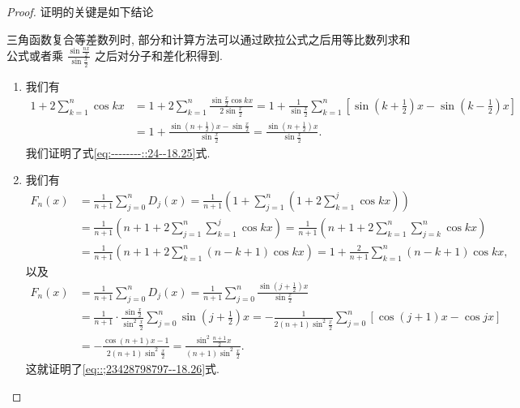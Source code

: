 \documentclass[../../main.tex]{subfiles}
\begin{document}
\begin{proof}
证明的关键是如下结论
\begin{conclusion}
三角函数复合等差数列时, 部分和计算方法可以通过欧拉公式之后用等比数列求和公式或者乘 $\frac{\sin \frac{nx}{2}}{\sin \frac{x}{2}}$ 之后对分子和差化积得到.
\end{conclusion}
\begin{enumerate}
\item 我们有
\begin{align*}
1 + 2\sum_{k = 1}^{n} \cos kx &= 1 + 2\sum_{k = 1}^{n} \frac{\sin \frac{x}{2} \cos kx}{2\sin \frac{x}{2}} = 1 + \frac{1}{\sin \frac{x}{2}} \sum_{k = 1}^{n} [\sin\left(k + \frac{1}{2}\right)x - \sin\left(k - \frac{1}{2}\right)x] \\
&= 1 + \frac{\sin\left(n + \frac{1}{2}\right)x - \sin \frac{x}{2}}{\sin \frac{x}{2}} = \frac{\sin\left(n + \frac{1}{2}\right)x}{\sin \frac{x}{2}}.
\end{align*}
我们证明了式\eqref{eq:--------::24--18.25}式.

\item 我们有
\begin{align*}
F_n(x) &= \frac{1}{n + 1}\sum_{j = 0}^{n} D_j(x) = \frac{1}{n + 1} \left( 1 + \sum_{j = 1}^{n} \left(1 + 2\sum_{k = 1}^{j} \cos kx \right) \right) \\
&= \frac{1}{n + 1} \left( n + 1 + 2\sum_{j = 1}^{n} \sum_{k = 1}^{j} \cos kx \right) = \frac{1}{n + 1} \left( n + 1 + 2\sum_{k = 1}^{n} \sum_{j = k}^{n} \cos kx \right) \\
&= \frac{1}{n + 1} \left( n + 1 + 2\sum_{k = 1}^{n} (n - k + 1)\cos kx \right) = 1 + \frac{2}{n + 1}\sum_{k = 1}^{n} (n - k + 1)\cos kx,
\end{align*}
以及
\begin{align*}
F_n(x) &= \frac{1}{n + 1}\sum_{j = 0}^{n} D_j(x) = \frac{1}{n + 1}\sum_{j = 0}^{n} \frac{\sin\left(j + \frac{1}{2}\right)x}{\sin \frac{x}{2}} \\
&= \frac{1}{n + 1} \cdot \frac{\sin \frac{x}{2}}{\sin^2 \frac{x}{2}} \sum_{j = 0}^{n} \sin\left(j + \frac{1}{2}\right)x = -\frac{1}{2(n + 1)\sin^2 \frac{x}{2}} \sum_{j = 0}^{n} [\cos(j + 1)x - \cos jx] \\
&= -\frac{\cos(n + 1)x - 1}{2(n + 1)\sin^2 \frac{x}{2}} = \frac{\sin^2 \frac{n + 1}{2}x}{(n + 1)\sin^2 \frac{x}{2}}.
\end{align*}
这就证明了\eqref{eq::;23428798797--18.26}式.
\end{enumerate}

\end{proof}
\end{document}
